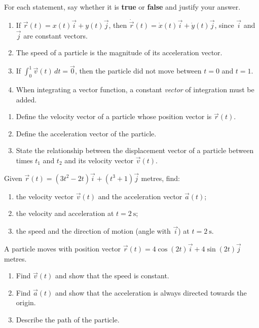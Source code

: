 \documentclass[11pt]{article}
\newcommand{\cle}[1]{{\popxbold\color{popdark}#1}}
\newcounter{popsec}
\newcounter{popsub}
\newcommand{\courssub}[1]{%
  \stepcounter{popsub}%
  \par\vspace{9pt}\noindent{\popxbold\fontsize{11.5}{13}\selectfont\color{popink}{\color{poporange}\thepopsec.\thepopsub}\hspace{6pt}#1}\par\nopagebreak\vspace{4pt}
}
\begin{document}
\begin{exercice}
For each statement, say whether it is \textbf{true} or \textbf{false} and justify your answer.
\begin{enumerate}
\item If $\vec{r}(t) = x(t)\vec{i} + y(t)\vec{j}$, then $\dot{\vec{r}}(t) = \dot{x}(t)\vec{i} + \dot{y}(t)\vec{j}$, since $\vec{i}$ and $\vec{j}$ are constant vectors.
\item The speed of a particle is the magnitude of its acceleration vector.
\item If $\displaystyle \int_0^1 \vec{v}(t)\,dt = \vec{0}$, then the particle did not move between $t = 0$ and $t = 1$.
\item When integrating a vector function, a constant \emph{vector} of integration must be added.
\end{enumerate}
\end{exercice}

\begin{exercice}[Definitions]
\begin{enumerate}
\item Define the \cle{velocity vector} of a particle whose position vector is $\vec{r}(t)$.
\item Define the \cle{acceleration vector} of the particle.
\item State the relationship between the displacement vector of a particle between times $t_1$ and $t_2$ and its velocity vector $\vec{v}(t)$.
\end{enumerate}
\end{exercice}

\begin{exercice}
Given $\vec{r}(t) = (3t^2 - 2t)\vec{i} + (t^3 + 1)\vec{j}$ metres, find:
\begin{enumerate}
\item the velocity vector $\vec{v}(t)$ and the acceleration vector $\vec{a}(t)$;
\item the velocity and acceleration at $t = 2\ \mathrm{s}$;
\item the speed and the direction of motion (angle with $\vec{i}$) at $t = 2\ \mathrm{s}$.
\end{enumerate}
\end{exercice}

\courssub{I practise}

\begin{exercice}
A particle moves with position vector $\vec{r}(t) = 4\cos(2t)\vec{i} + 4\sin(2t)\vec{j}$ metres.
\begin{enumerate}
\item Find $\vec{v}(t)$ and show that the speed is constant.
\item Find $\vec{a}(t)$ and show that the acceleration is always directed towards the origin.
\item Describe the path of the particle.
\end{enumerate}
\end{exercice}
\end{document}
